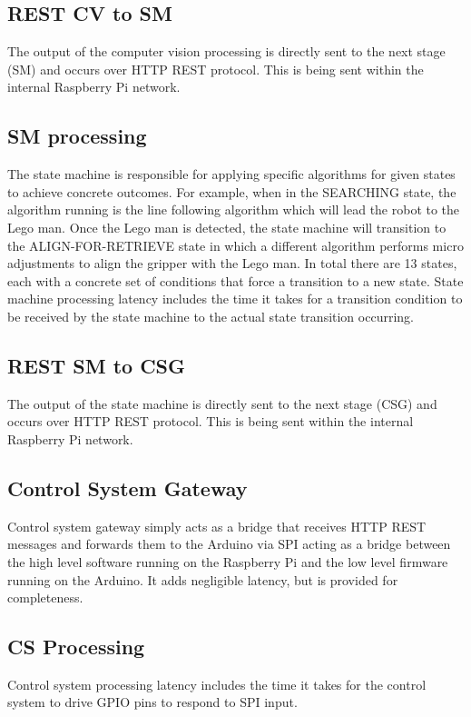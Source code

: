 \documentclass[11pt]{article}
\begin{document}
\subsection{REST CV to SM}
The output of the computer vision processing is directly sent to the next stage (SM) and occurs over HTTP REST protocol. This is being sent within the internal Raspberry Pi network.

\subsection{SM processing}
The state machine is responsible for applying specific algorithms for given states to achieve concrete outcomes. 
For example, when in the SEARCHING state, the algorithm running is the line following algorithm which 
will lead the robot to the Lego man. Once the Lego man is detected, the state machine will transition to the ALIGN-FOR-RETRIEVE state in which a 
different algorithm performs micro adjustments to align the gripper with the Lego man. In total there are 13 states, each with a concrete set of 
conditions that force a transition to a new state. State machine processing latency includes the time it takes for a transition condition to be received by the state machine to the actual state transition occurring. 

\subsection{REST SM to CSG}
The output of the state machine is directly sent to the next stage (CSG) and occurs over HTTP REST protocol. This is being sent within the internal Raspberry Pi network.

\subsection{Control System Gateway}
Control system gateway simply acts as a bridge that receives HTTP REST messages and forwards them to the Arduino via SPI acting as a bridge between 
the high level software running on the Raspberry Pi and the low level firmware running on the Arduino. It adds negligible latency, but is provided for completeness.

\subsection{CS Processing}
Control system processing latency includes the time it takes for the control system to drive GPIO pins to respond to SPI input.
\end{document}

